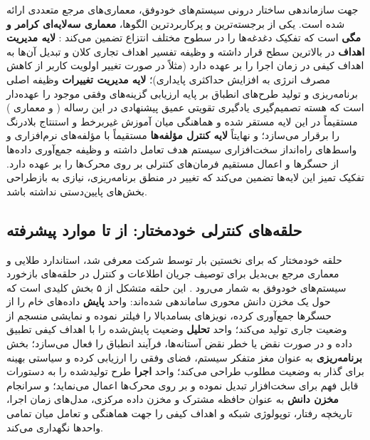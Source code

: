 \documentclass[oneside,openany,phd]{TMU-Thesis}
\begin{document}
جهت سازماندهی ساختار درونی سیستم‌های خودوفق، معماری‌های مرجع متعددی ارائه شده است. یکی از برجسته‌ترین و پرکاربردترین الگوها، \textbf{معماری سه‌لایه‌ای کرامر و مگی} است که تفکیک دغدغه‌ها را در سطوح مختلف انتزاع تضمین می‌کند \cite{kramer2007self}: \textbf{لایه مدیریت اهداف} در بالاترین سطح قرار داشته و وظیفه تفسیر اهداف تجاری کلان و تبدیل آن‌ها به اهداف کیفی در زمان اجرا را بر عهده دارد (مثلاً در صورت تغییر اولویت کاربر از کاهش مصرف انرژی به افزایش حداکثری پایداری)؛ \textbf{لایه مدیریت تغییرات} وظیفه اصلی برنامه‌ریزی و تولید طرح‌های انطباق بر پایه ارزیابی گزینه‌های وفقی موجود را عهده‌دار است که هسته تصمیم‌گیری یادگیری تقویتی عمیق پیشنهادی در این رساله ( و معماری \rsdrlplus) مستقیماً در این لایه مستقر شده و هماهنگی میان آموزش غیربرخط و استنتاج بلادرنگ را برقرار می‌سازد؛ و نهایتاً \textbf{لایه کنترل مؤلفه‌ها} مستقیماً با مؤلفه‌های نرم‌افزاری و واسط‌های راه‌انداز سخت‌افزاری سیستم هدف تعامل داشته و وظیفه جمع‌آوری داده‌ها از حسگرها و اعمال مستقیم فرمان‌های کنترلی بر روی محرک‌ها را بر عهده دارد. تفکیک تمیز این لایه‌ها تضمین می‌کند که تغییر در منطق برنامه‌ریزی، نیازی به بازطراحی بخش‌های پایین‌دستی نداشته باشد.

\subsection{حلقه‌های کنترلی خودمختار: از  تا موارد پیشرفته}

حلقه خودمختار  که برای نخستین بار توسط شرکت  معرفی شد، استاندارد طلایی و معماری مرجع بی‌بدیل برای توصیف جریان اطلاعات و کنترل در حلقه‌های بازخورد سیستم‌های خودوفق به شمار می‌رود \cite{kephart2003vision}. این حلقه متشکل از ۵ بخش کلیدی است که حول یک مخزن دانش محوری ساماندهی شده‌اند: واحد \textbf{پایش} داده‌های خام را از حسگرها جمع‌آوری کرده، نویزهای بسامدبالا را فیلتر نموده و نمایشی منسجم از وضعیت جاری تولید می‌کند؛ واحد \textbf{تحلیل} وضعیت پایش‌شده را با اهداف کیفی تطبیق داده و در صورت نقض یا خطر نقض آستانه‌ها، فرآیند انطباق را فعال می‌سازد؛ بخش \textbf{برنامه‌ریزی} به عنوان مغز متفکر سیستم، فضای وفقی را ارزیابی کرده و سیاستی بهینه برای گذار به وضعیت مطلوب طراحی می‌کند؛ واحد \textbf{اجرا} طرح تولیدشده را به دستورات قابل فهم برای سخت‌افزار تبدیل نموده و بر روی محرک‌ها اعمال می‌نماید؛ و سرانجام \textbf{مخزن دانش} به عنوان حافظه مشترک و مخزن داده مرکزی، مدل‌های زمان اجرا، تاریخچه رفتار، توپولوژی شبکه و اهداف کیفی را جهت هماهنگی و تعامل میان تمامی واحدها نگهداری می‌کند.
\end{document}
